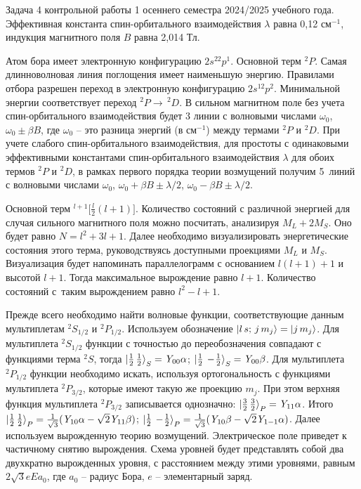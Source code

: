  Задача 4 контрольной работы 1 осеннего семестра 2024/2025 учебного года. Эффективная константа спин-орбитального взаимодействия $\lambda$ равна 0,12 см$^{-1}$, индукция магнитного поля $B$ равна 2,014 Тл.\par
{} Атом бора имеет электронную конфигурацию $2s^22p^1$. Основной терм $^2P$. Самая длинноволновая линия поглощения имеет наименьшую энергию. Правилами отбора разрешен переход в электронную конфигурацию $2s^12p^2$. Минимальной энергии соответствует переход $^2P \rightarrow\,^2D$. В сильном магнитном поле без учета спин-орбитального взаимодействия будет 3 линии с волновыми числами $\omega_{0}$, $\omega_{0} \pm \beta B$, где $\omega_{0}$ – это разница энергий (в см$^{-1}$) между термами $^2P$ и $^2D$. При учете слабого спин-орбитального взаимодействия, для простоты с одинаковыми эффективными константами спин-орбитального взаимодействия $\lambda$ для обоих термов $^2P$ и $^2D$, в рамках первого порядка теории возмущений получим 5~линий с волновыми числами $\omega_{0}$, $\omega_{0} + \beta B \pm \lambda/2$, $\omega_{0} - \beta B \pm \lambda/2$.\par
{} Основной терм $^{l+1} \Big[ \frac l2 (l+1) \Big]$. Количество состояний с различной энергией для случая сильного магнитного поля можно посчитать, анализируя $M_L+2M_S$. Оно будет равно $N=l^2+3l+1$. Далее необходимо визуализировать энергетические состояния этого терма, руководствуясь доступными проекциями $M_L$ и $M_S$. Визуализация будет напоминать параллелограмм с основанием $l(l+1)+1$ и высотой $l+1$. Тогда максимальное вырождение равно $l+1$. Количество состояний с~таким вырождением равно $l^2-l+1$.\par
 Прежде всего необходимо найти волновые функции, соответствующие данным мультиплетам $^2S_{1/2}$ и $^2P_{1/2}$. Используем обозначение $\ket{l\, s;\, j \, m_j} = \ket{j\,m_j}$. Для мультиплета $^2S_{1/2}$ функции с точностью до переобозначения совпадают с функциями терма $^2S$, тогда $\ket{ \frac12 \,  \frac12}_S = \textit{Y}_{00}\alpha$; $\ket{ \frac12\,-\!\frac{1}{2}}_S = \textit{Y}_{00}\beta$. Для мультиплета $^2P_{1/2}$ функции необходимо искать, используя ортогональность с функциями мультиплета $^2P_{3/2}$, которые имеют такую же проекцию $m_j$. При этом верхняя функция мультиплета $^2P_{3/2}$ записывается однозначно: $\ket{ \frac32 \,  \frac32}_P = \textit{Y}_{11}\alpha$. Итого
$\ket{ \frac12 \,  \frac12}_P = \frac{1}{\sqrt3}(\textit{Y}_{10}\alpha - \sqrt2 \textit{Y}_{11} \beta) $; $\ket{ \frac12\,-\!\frac{1}{2}}_P =  \frac{1}{\sqrt3}(\textit{Y}_{10}\beta - \sqrt2 \textit{Y}_{1-1} \alpha)$. Далее используем вырожденную теорию возмущений. Электрическое поле приведет к частичному снятию вырождения. Схема уровней будет представлять собой два двухкратно вырожденных уровня, с расстоянием между этими уровнями, равным $2\sqrt3 eEa_0$, где $a_0$ – радиус Бора, $e$ – элементарный заряд.\par
